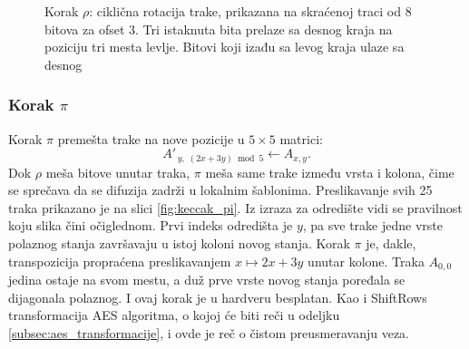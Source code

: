 \begin{figure}[H]
\centering
{}
\caption[Korak $\rho$: ciklična rotacija trake]{Korak $\rho$: ciklična rotacija trake, prikazana na skraćenoj traci od 8 bitova za ofset 3. Tri istaknuta bita prelaze sa desnog kraja na poziciju tri mesta levlje. Bitovi koji izađu sa levog kraja ulaze sa desnog}
\label{fig:keccak_rho}
\end{figure}

\subsubsection{Korak \texorpdfstring{$\pi$}{pi}}

Korak $\pi$ premešta trake na nove pozicije u $5 \times 5$ matrici:
\begin{equation}
    A'_{\,y,\;(2x+3y) \bmod 5} \gets A_{x,y}.
\end{equation}
Dok $\rho$ meša bitove unutar traka, $\pi$ meša same trake između vrsta i kolona, čime se sprečava da se difuzija zadrži u lokalnim šablonima. Preslikavanje svih 25 traka prikazano je na slici \ref{fig:keccak_pi}. Iz izraza za odredište vidi se pravilnost koju slika čini očiglednom. Prvi indeks odredišta je $y$, pa sve trake jedne vrste polaznog stanja završavaju u istoj koloni novog stanja. Korak $\pi$ je, dakle, transpozicija propraćena preslikavanjem $x \mapsto 2x + 3y$ unutar kolone. Traka $A_{0,0}$ jedina ostaje na svom mestu, a duž prve vrste novog stanja poređala se dijagonala polaznog. I ovaj korak je u hardveru besplatan. Kao i ShiftRows transformacija AES algoritma, o kojoj će biti reči u odeljku \ref{subsec:aes_transformacije}, i ovde je reč o čistom preusmeravanju veza.

